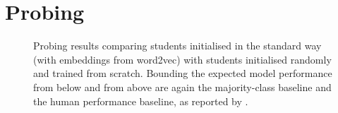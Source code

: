 \documentclass[bsc,frontabs,twoside,singlespacing,parskip,deptreport]{infthesis}
\begin{document}
\chapter{Probing}{
  \label{chap:A-probing}
  \begin{figure}[h!tb]
    \centering
    \caption{Probing results comparing students initialised in the standard way (with embeddings from word2vec) with students initialised randomly and trained from scratch. Bounding the expected model performance from below and from above are again the majority-class baseline and the human performance baseline, as reported by \citet{Conneau_2018}.}
    \label{fig:probing-students-scratch}
  \end{figure}
}
\end{document}
